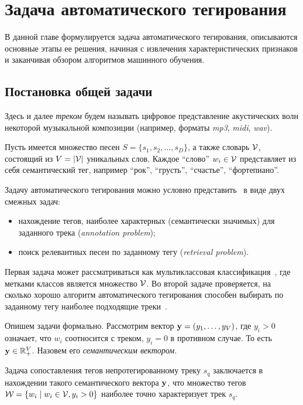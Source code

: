 \chapter{Задача автоматического тегирования}
\label{chapter1}

В данной главе формулируется задача автоматического тегирования, описываются основные этапы ее решения, 
начиная с извлечения характеристических признаков и заканчивая обзором алгоритмов машинного обучения.

\section{Постановка общей задачи}
Здесь и далее \emph{треком} будем называть цифровое представление акустических волн некоторой музыкальной композиции (например, форматы \emph{mp3}, \emph{midi}, \emph{wav}).

Пусть имеется множество песен $S = \{s_1, s_2, \ldots, s_D \}$, а также словарь $ \mathcal{V} $, состоящий из $V = |\mathcal{V}| $ уникальных слов. 
Каждое ``слово'' $w_i \in \mathcal{V}$ представляет из себя семантический тег, например ``рок'', ``грусть'', ``счастье'', ``фортепиано''.

Задачу автоматического тегирования можно условно представить~\cite{msordo_thesis} в виде двух смежных задач: 
\begin{itemize}
 \item нахождение тегов, наиболее характерных (семантически значимых) для заданного трека (\emph{annotation problem});
 \item поиск релевантных песен по заданному тегу (\emph{retrieval problem}).
\end{itemize}

Первая задача может рассматриваться как мультиклассовая классификация~\cite{multilabelclassification, multilabel_1}, где метками классов является множество $\mathcal{V}$.
Во второй задаче проверяется, на сколько хорошо алгоритм автоматического тегирования способен выбирать по заданному тегу наиболее подходящие треки~\cite{msordo_thesis}.

Опишем задачи формально.
Рассмотрим вектор $\mathbf{y} = (y_1, \ldots, y_V)$, где $y_i > 0$ означает, что $w_i$ соотносится с треком, $y_i = 0$ в противном случае. То есть $\mathbf{y} \in \mathbb{R}^{V}_{+}$.
Назовем его \emph{семантическим вектором}.

Задача сопоставления тегов непротегированному треку $s_q$ заключается в нахождении такого семантического вектора $\mathbf{y}$, 
что множество тегов $\mathcal{W} = \{w_i \mid w_i \in \mathcal{V}, y_i > 0\}$ наиболее точно характеризует трек $s_q$.


